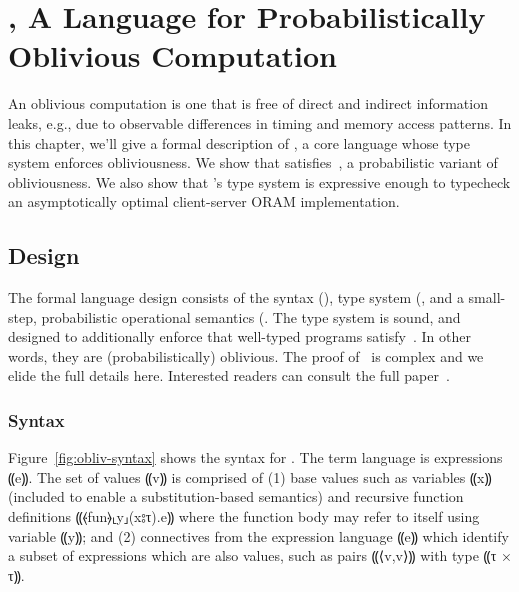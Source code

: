 \chapter{\obliv, A Language for Probabilistically Oblivious Computation}
\label{ch:obliv}


An oblivious computation is one that is free of direct and indirect information leaks, e.g., due to observable differences
in timing and memory access patterns. In this chapter, we'll give a formal description of \obliv, a core language whose
type system enforces obliviousness. We show that \obliv satisfies~, a probabilistic variant of obliviousness.
We also show that \obliv's type system is expressive enough to typecheck an asymptotically optimal client-server ORAM implementation.

\section{Design}
\label{sec:obliv-design}

The formal language design consists of the syntax (), type system (,
and a small-step, probabilistic operational semantics (. The type system is sound, and designed to additionally
enforce that well-typed programs satisfy~. In other words, they are (probabilistically) oblivious.
The proof of~ is complex and we elide the full details here. Interested readers can consult the full paper~\cite{}.


\subsection{Syntax}
\label{subsec:obliv-design-syntax}

Figure~\ref{fig:obliv-syntax} shows the syntax for \obliv. The term language is
expressions ⸨e⸩. The set of values ⸨v⸩ is comprised of (1) base values such as
variables ⸨x⸩ (included to enable a substitution-based semantics) and recursive function
definitions ⸨⦑fun⦒⸤y⸥(x{⦂}τ).e⸩ where the function body may refer to itself
using variable ⸨y⸩; and (2) connectives from the expression language ⸨e⸩ which
identify a subset of expressions which are also values, such as pairs ⸨⟨v,v⟩⸩
with type ⸨τ × τ⸩.

